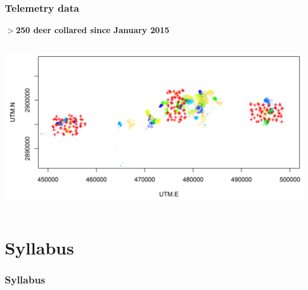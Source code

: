 \documentclass[color=usenames,dvipsnames]{beamer}
\begin{document}






\begin{frame}
  \frametitle{Telemetry data}
  \centering
  \bf
  $>$250 deer collared since January 2015 \\
  \begin{columns}
    \column{\dimexpr\paperwidth-10pt}
    \includegraphics[width=\textwidth]{figs/camTelem}
  \end{columns}
\end{frame}







\section{Syllabus}


\begin{frame}
  \frametitle{Syllabus}
  \begin{columns}%
    \begin{column}{0.5\textwidth}
    \end{column}
  \end{columns}
\end{frame}
\end{document}
